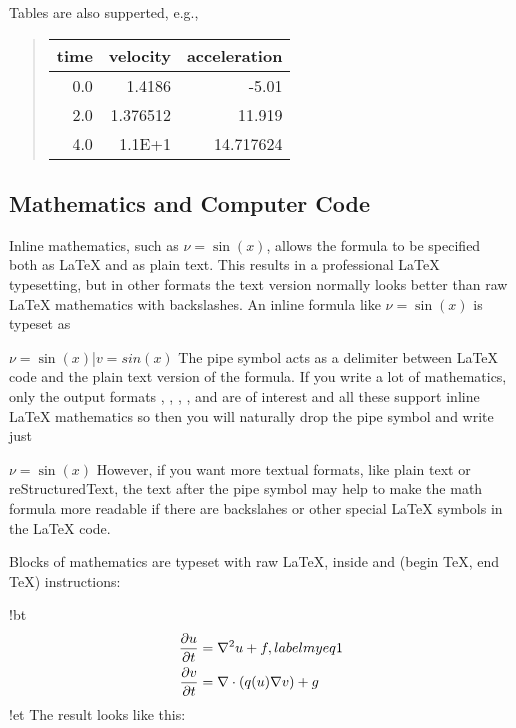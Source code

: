 \documentclass[%
oneside,                 %
final,                   %
chapterprefix=true,      %
open=right               %
10pt]{book}
\begin{document}
Tables are also supperted, e.g.,


\begin{quote}\begin{tabular}{rrr}
\hline
\multicolumn{1}{c}{ time } & \multicolumn{1}{c}{ velocity } & \multicolumn{1}{c}{ acceleration } \\
\hline
0.0          & 1.4186       & -5.01        \\
2.0          & 1.376512     & 11.919       \\
4.0          & 1.1E+1       & 14.717624    \\
\hline
\end{tabular}\end{quote}

\noindent

\subsection{Mathematics and Computer Code}

Inline mathematics, such as $\nu = \sin(x)$,
allows the formula to be specified both as {\LaTeX} and as plain text.
This results in a professional {\LaTeX} typesetting, but in other formats
the text version normally looks better than raw {\LaTeX} mathematics with
backslashes. An inline formula like $\nu = \sin(x)$ is
typeset as

\bccq
$\nu = \sin(x)$|$v = sin(x)$
\eccq
The pipe symbol acts as a delimiter between {\LaTeX} code and the plain text
version of the formula. If you write a lot of mathematics, only the
output formats , , , , and 
are of interest
and all these support inline {\LaTeX} mathematics so then you will naturally
drop the pipe symbol and write just

\bccq
$\nu = \sin(x)$
\eccq
However, if you want more textual formats, like plain text or reStructuredText,
the text after the pipe symbol may help to make the math formula more readable
if there are backslahes or other special {\LaTeX} symbols in the {\LaTeX} code.

Blocks of mathematics are typeset with raw {\LaTeX}, inside
 and  (begin TeX, end TeX) instructions:

\bccq
!bt
\begin{align}
{\partial u\over\partial t} &= \nabla^2 u + f, label{myeq1}\\
{\partial v\over\partial t} &= \nabla\cdot(q(u)\nabla v) + g
\end{align}
!et
\eccq
The result looks like this:
\end{document}
